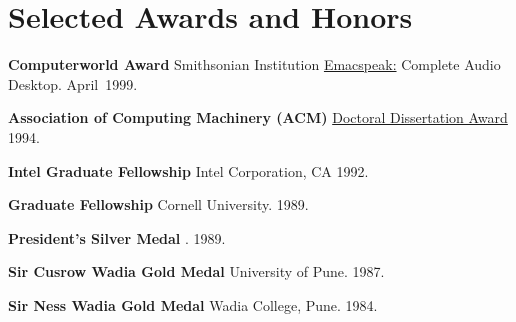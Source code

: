 \documentclass{article}
\begin{document}
\section*{Selected Awards and Honors}
\begin{compactitem}
\item \textbf{Computerworld Award} {Smithsonian Institution}
  \href{http://emacspeak.sf.net}{Emacspeak:} Complete Audio
  Desktop. \hfill April~1999.
\item \textbf{Association of Computing Machinery (ACM)}
  \href{http://www.acm.org/awards/dd_citation/1994B.html}{%
    Doctoral Dissertation Award} \hfill1994.
\item \textbf{Intel Graduate Fellowship} {Intel Corporation, CA}
  \hfill 1992.
\item \textbf{Graduate Fellowship} Cornell University.  \hfill
  1989.
\item \textbf{President's Silver Medal} {\iitb}.  \hfill 1989.
\item \textbf{Sir Cusrow Wadia Gold Medal} {University of Pune}.
  \hfill 1987.
\item \textbf{Sir Ness Wadia Gold Medal} {Wadia College, Pune}.  \hfill 1984.
\end{compactitem}
\end{document}
